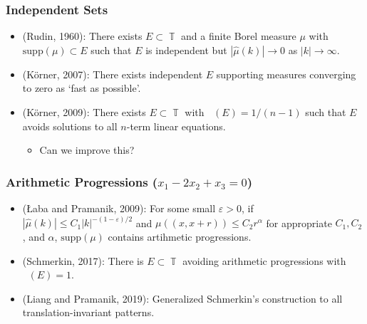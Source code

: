 \documentclass[usenames,dvipsnames]{beamer}
\DeclareMathOperator{\TT}{\mathbb{T}}
\DeclareMathOperator{\fordim}{\text{dim}_{\mathbb{F}}}
\begin{document}
\begin{frame}
    \frametitle{Independent Sets}

    \begin{itemize}
        \item (Rudin, 1960): There exists $E \subset \TT$ and a finite Borel measure $\mu$ with $\text{supp}(\mu) \subset E$ such that $E$ is independent but $|\widehat{\mu}(k)| \to 0$ as $|k| \to \infty$.

        \pause
        \item (K\"{o}rner, 2007): There exists independent $E$ supporting measures converging to zero as `fast as possible'.

        \pause
        \item (K\"{o}rner, 2009): There exists $E \subset \TT$ with $\fordim(E) = 1/(n-1)$ such that $E$ avoids solutions to all $n$-term linear equations.

        \begin{itemize}
            \pause
            \item Can we improve this?
        \end{itemize}
    \end{itemize}
\end{frame}


\begin{frame}
    \frametitle{Arithmetic Progressions ($x_1 - 2x_2 + x_3 = 0$)}

    \begin{itemize}
        \pause
        \item (Łaba and Pramanik, 2009): For some small $\varepsilon > 0$, if $|\widehat{\mu}(k)| \leq C_1 |k|^{-(1-\varepsilon)/2}$ and $\mu((x,x+r)) \leq C_2 r^\alpha$ for appropriate $C_1,C_2$, and $\alpha$, $\text{supp}(\mu)$ contains artihmetic progressions.

        \pause
        \item (Schmerkin, 2017): There is $E \subset \TT$ avoiding arithmetic progressions with $\fordim(E) = 1$.

        \pause
        \item (Liang and Pramanik, 2019): Generalized Schmerkin's construction to all translation-invariant patterns.
    \end{itemize}
\end{frame}
\end{document}
